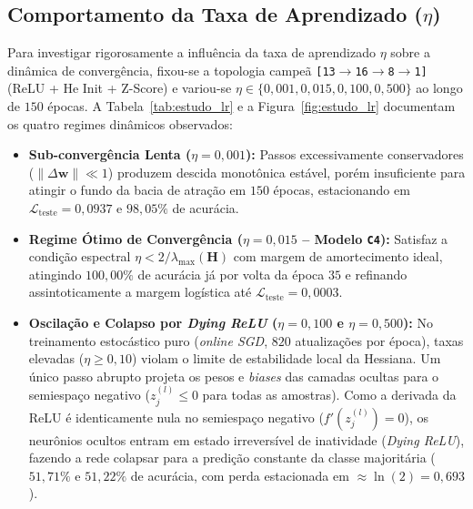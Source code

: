 ﻿\documentclass[runningheads]{llncs}
\begin{document}
\subsection{Comportamento da Taxa de Aprendizado ($\eta$)}
Para investigar rigorosamente a influ\^{e}ncia da taxa de aprendizado $\eta$ sobre a din\^{a}mica de converg\^{e}ncia, fixou-se a topologia campe\~{a} \texttt{[13$\to$16$\to$8$\to$1]} (ReLU + He Init + Z-Score) e variou-se $\eta \in \{0{,}001, 0{,}015, 0{,}100, 0{,}500\}$ ao longo de $150$ \'{e}pocas. A Tabela~\ref{tab:estudo_lr} e a Figura~\ref{fig:estudo_lr} documentam os quatro regimes din\^{a}micos observados:
\begin{itemize}
    \item \textbf{Sub-converg\^{e}ncia Lenta ($\eta = 0{,}001$):} Passos excessivamente conservadores ($\|\Delta \mathbf{w}\| \ll 1$) produzem descida monot\^{o}nica est\'{a}vel, por\'{e}m insuficiente para atingir o fundo da bacia de atra\c{c}\~{a}o em $150$ \'{e}pocas, estacionando em $\mathcal{L}_{\text{teste}} = 0{,}0937$ e $98{,}05\%$ de acur\'{a}cia.
    \item \textbf{Regime \'{O}timo de Converg\^{e}ncia ($\eta = 0{,}015$ -- Modelo \texttt{C4}):} Satisfaz a condi\c{c}\~{a}o espectral $\eta < 2/\lambda_{\max}(\mathbf{H})$ com margem de amortecimento ideal, atingindo $100{,}00\%$ de acur\'{a}cia j\'{a} por volta da \'{e}poca $35$ e refinando assintoticamente a margem log\'{i}stica at\'{e} $\mathcal{L}_{\text{teste}} = 0{,}0003$.
    \item \textbf{Oscila\c{c}\~{a}o e Colapso por \textit{Dying ReLU} ($\eta = 0{,}100$ e $\eta = 0{,}500$):} No treinamento estoc\'{a}stico puro (\textit{online SGD}, $820$ atualiza\c{c}\~{o}es por \'{e}poca), taxas elevadas ($\eta \ge 0{,}10$) violam o limite de estabilidade local da Hessiana. Um \'{u}nico passo abrupto projeta os pesos e \textit{biases} das camadas ocultas para o semiespa\c{c}o negativo ($z_j^{(l)} \le 0$ para todas as amostras). Como a derivada da ReLU \'{e} identicamente nula no semiespa\c{c}o negativo ($f'(z_j^{(l)}) = 0$), os neur\^{o}nios ocultos entram em estado irrevers\'{i}vel de inatividade (\textit{Dying ReLU}), fazendo a rede colapsar para a predi\c{c}\~{a}o constante da classe majorit\'{a}ria ($51{,}71\%$ e $51{,}22\%$ de acur\'{a}cia, com perda estacionada em $\approx \ln(2) = 0{,}693$).
\end{itemize}
\end{document}
